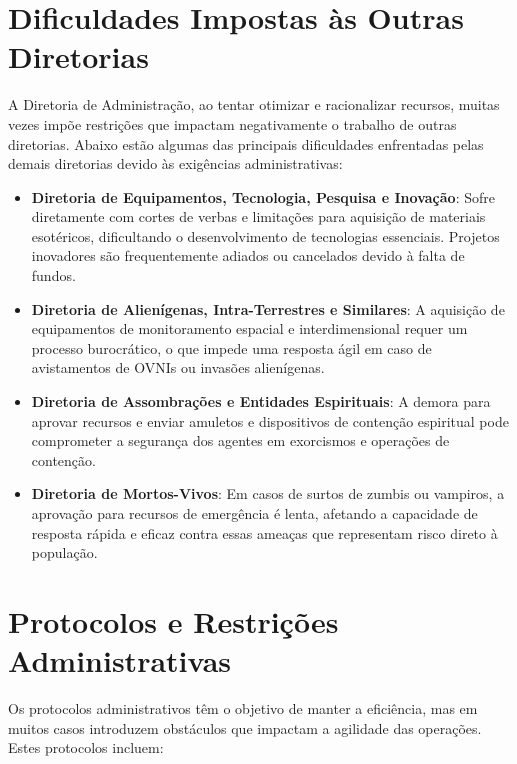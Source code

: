 \section{Dificuldades Impostas às Outras Diretorias}

A Diretoria de Administração, ao tentar otimizar e racionalizar recursos, muitas vezes impõe restrições que impactam negativamente o trabalho de outras diretorias. Abaixo estão algumas das principais dificuldades enfrentadas pelas demais diretorias devido às exigências administrativas:

\begin{itemize}
    \item \textbf{Diretoria de Equipamentos, Tecnologia, Pesquisa e Inovação}: Sofre diretamente com cortes de verbas e limitações para aquisição de materiais esotéricos, dificultando o desenvolvimento de tecnologias essenciais. Projetos inovadores são frequentemente adiados ou cancelados devido à falta de fundos.
    \item \textbf{Diretoria de Alienígenas, Intra-Terrestres e Similares}: A aquisição de equipamentos de monitoramento espacial e interdimensional requer um processo burocrático, o que impede uma resposta ágil em caso de avistamentos de OVNIs ou invasões alienígenas.
    \item \textbf{Diretoria de Assombrações e Entidades Espirituais}: A demora para aprovar recursos e enviar amuletos e dispositivos de contenção espiritual pode comprometer a segurança dos agentes em exorcismos e operações de contenção.
    \item \textbf{Diretoria de Mortos-Vivos}: Em casos de surtos de zumbis ou vampiros, a aprovação para recursos de emergência é lenta, afetando a capacidade de resposta rápida e eficaz contra essas ameaças que representam risco direto à população.
\end{itemize}

\section{Protocolos e Restrições Administrativas}
Os protocolos administrativos têm o objetivo de manter a eficiência, mas em muitos casos introduzem obstáculos que impactam a agilidade das operações. Estes protocolos incluem:

